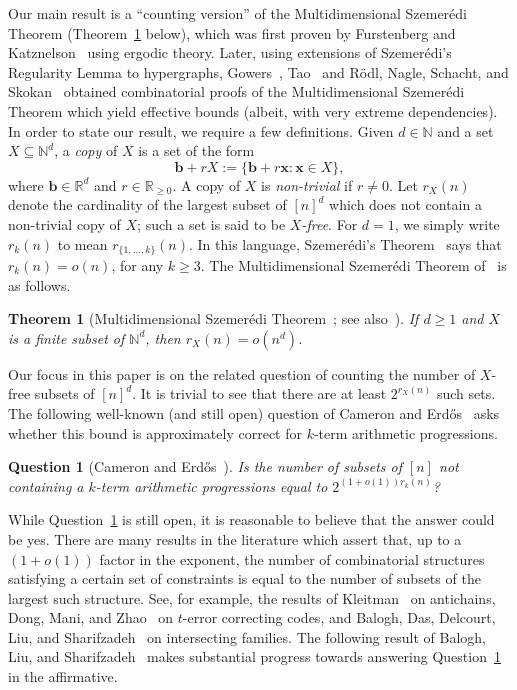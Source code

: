 \documentclass[12pt]{article}
\numberwithin{equation}{section}
\newcommand{\N}{\mathbb{N}}
\newtheorem{thm}[equation]{Theorem}
\newtheorem{ques}[equation]{Question}
\theoremstyle{definition}
\theoremstyle{remark}
\renewcommand{\vec}{\boldsymbol}
\begin{document}
Our main result is a ``counting version'' of the Multidimensional Szemer\'edi Theorem (Theorem~\ref{thm: multi-sz} below), which was first proven by Furstenberg and Katznelson~\cite{katznelson} using ergodic theory. Later, using extensions of Szemer\'edi's Regularity Lemma to hypergraphs, Gowers~\cite{gowers-multi}, Tao~\cite{tao} and R\"odl, Nagle, Schacht, and Skokan~\cite{skokan, nagle} obtained combinatorial proofs of the Multidimensional Szemer\'edi Theorem which yield effective bounds (albeit, with very extreme dependencies). In order to state our result, we require a few definitions. Given $d\in \mathbb{N}$ and a set $X\subseteq \mathbb{N}^d$, a \emph{copy} of $X$ is a set of the form
\[\vec{b}+rX :=\{\vec{b}+r\vec{x}: \vec{x}\in X\},\]
where $\vec{b}\in \mathbb{R}^d$ and $r\in \mathbb{R}_{\geq 0}$. A copy of $X$ is \emph{non-trivial} if $r\neq 0$. Let $r_X(n)$ denote the cardinality of the largest subset of $[n]^d$ which does not contain a non-trivial copy of $X$; such a set is said to be \emph{$X$-free}. For $d=1$, we simply write $r_k(n)$ to mean $r_{\{1,\dots,k\}}(n)$. In this language, Szemer\'edi's Theorem~\cite{szemeredi} says that $r_k(n)=o(n)$, for any $k\geq3$. The Multidimensional Szemer\'edi Theorem of~\cite{katznelson} is as follows.

\begin{thm}[Multidimensional Szemer\'edi Theorem~\cite{katznelson}; see also~\cite{gowers-multi,tao,skokan,nagle}]\label{thm: multi-sz}
If $d\geq1$ and $X$ is a finite subset of $\N^d$, then $r_X(n) = o(n^d)$. 
\end{thm}

Our focus in this paper is on the related question of counting the number of $X$-free subsets of $[n]^d$. It is trivial to see that there are at least $2^{r_X(n)}$ such sets. The following well-known (and still open) question of Cameron and Erd\H{o}s~\cite{erdos-question} asks whether this bound is approximately correct for $k$-term arithmetic progressions.

\begin{ques}[Cameron and Erd\H{o}s~{\cite[Section~4.2]{erdos-question}}]\label{ques: enumeration}
Is the number of subsets of $[n]$ not containing a $k$-term arithmetic progressions equal to $2^{(1+ o(1))r_k(n)}$? 
\end{ques} 

While Question~\ref{ques: enumeration} is still open, it is reasonable to believe that the answer could be yes. There are many results in the literature which assert that, up to a $(1+o(1))$ factor in the exponent, the number of combinatorial structures satisfying a certain set of constraints is equal to the number of subsets of the largest such structure. See, for example, the results of Kleitman~\cite{kleitman} on antichains, Dong, Mani, and Zhao~\cite{t-error} on $t$-error correcting codes, and Balogh, Das, Delcourt, Liu, and Sharifzadeh~\cite{delcourt} on intersecting families. The following result of Balogh, Liu, and Sharifzadeh~\cite{balogh} makes substantial progress towards answering Question~\ref{ques: enumeration} in the affirmative. 
\end{document}
